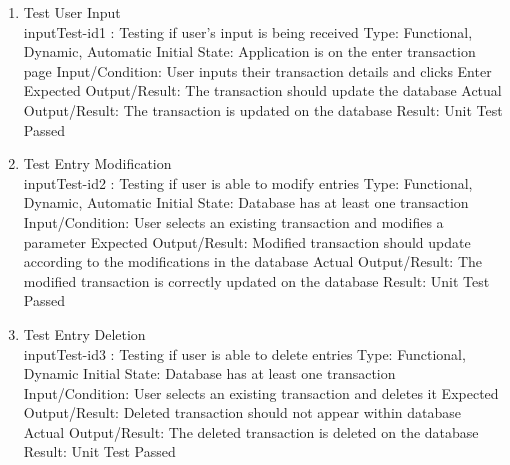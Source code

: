 \documentclass[12pt, titlepage]{article}
\begin{document}
\begin{enumerate}

\item{Test User Input\\} \label{I1}
inputTest-id1 : Testing if user’s input is being received
\newline
Type: Functional, Dynamic, Automatic
\newline
Initial State: Application is on the enter transaction page
\newline
Input/Condition: User inputs their transaction details and clicks Enter
\newline
Expected Output/Result: The transaction should update the database 
\newline
Actual Output/Result: The transaction is updated on the database 
\newline
Result: Unit Test Passed

					
\item{Test Entry Modification\\} \label{I2}
inputTest-id2 : Testing if user is able to modify entries
\newline
Type: Functional, Dynamic, Automatic
\newline
Initial State: Database has at least one transaction
\newline
Input/Condition: User selects an existing transaction and modifies a parameter
\newline
Expected Output/Result: Modified transaction should update according to the modifications in the database
\newline
Actual Output/Result: The modified transaction is correctly updated on the database 
\newline
Result: Unit Test Passed

\item{Test Entry Deletion\\}\label{I3}
inputTest-id3 : Testing if user is able to delete entries
\newline
Type: Functional, Dynamic
\newline
Initial State: Database has at least one transaction
\newline
Input/Condition: User selects an existing transaction and deletes it
\newline
Expected Output/Result: Deleted transaction should not appear within database
\newline
Actual Output/Result: The deleted transaction is deleted on the database 
\newline
Result: Unit Test Passed


\end{enumerate}
\end{document}

